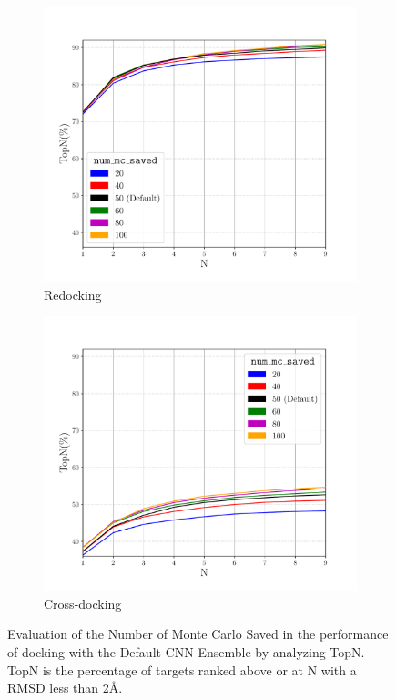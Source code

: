 \documentclass[journal=jcisd8,manuscript=article]{achemso}
\begin{document}
\begin{figure}    
        \begin{subfigure}[b]{0.48\textwidth}    
		\centering
		\includegraphics[width=\textwidth]{figures/redocking/sweep_mcsaved_line.pdf}
		\caption{Redocking}
		\label{fig:mcsaved rd}
        \end{subfigure}    
        \begin{subfigure}[b]{0.48\textwidth}    
		\centering
		\includegraphics[width=\textwidth]{figures/crossdocking/sweep_mcsaved_line.pdf}
		\caption{Cross-docking}
		\label{fig:mcsaved cd}
        \end{subfigure}    
	\caption{Evaluation of the Number of Monte Carlo Saved in the performance of docking with the Default CNN Ensemble by analyzing TopN. TopN is the percentage of targets ranked above or at N with a RMSD less than 2{\AA}.}
	\label{fig:mcsaved}
\end{figure}    
\end{document}
